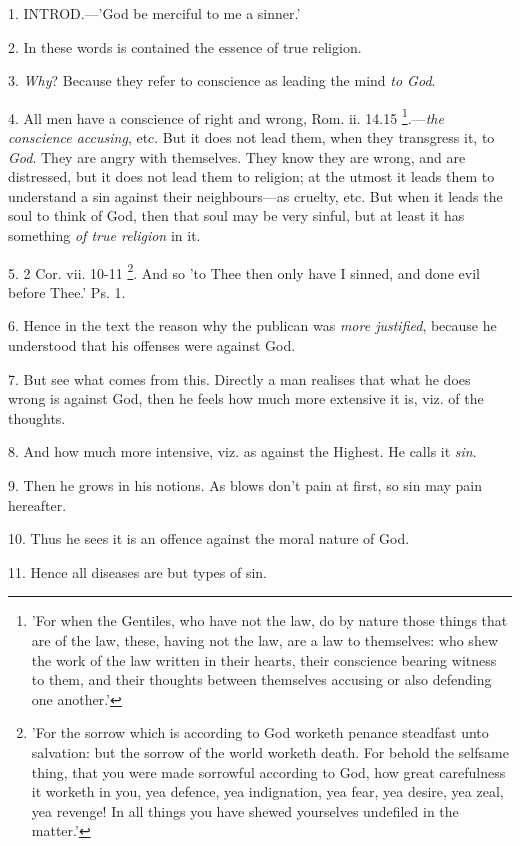 
1. INTROD.—'God
be merciful to me a sinner.'

2. In these words is contained the essence of
true religion.

3. \emph{Why}? Because they refer to conscience
as leading the mind \emph{to God}.

4. All men have a conscience of right and wrong,
Rom. ii. 14.15 \footnote{'For when the Gentiles,
who have not the law, do by nature those things that are of the law,
these, having not the law, are a law to themselves: who shew the work
of the law written in their hearts, their conscience bearing witness
to them, and their thoughts between themselves accusing or also
defending one another.'}.—\emph{the
conscience accusing}, etc. But it does not lead them, when they
transgress it, to \emph{God}. They are angry with themselves. They
know they are wrong, and are distressed, but it does not lead them to
religion; at the utmost it leads them to understand a sin against
their neighbours—as cruelty, etc. But when it leads the soul to
think of God, then that soul may be very sinful, but at least it has
something \emph{of true religion} in it.

5. 2 Cor. vii. 10-11 \footnote{'For the sorrow which is
according to God worketh penance steadfast unto salvation: but the
sorrow of the world worketh death. For behold the selfsame thing, that
you were made sorrowful according to God, how great carefulness it
worketh in you, yea defence, yea indignation, yea fear, yea desire,
yea zeal, yea revenge! In all things you have shewed yourselves
undefiled in the matter.'}. And so 'to Thee then only have I sinned, and done evil before
Thee.' Ps. 1.

6. Hence in the text the reason why the publican
was \emph{more justified}, because he understood that his offenses
were against God.

7. But see what comes from this. Directly a man
realises that what he does wrong is against God, then he feels how
much more extensive it is, viz. of the thoughts.

8. And how much more intensive, viz. as against
the Highest. He calls it \emph{sin}.

9. Then he grows in his notions. As blows don't
pain at first, so sin may pain hereafter.

10. Thus he sees it is an offence against the
moral nature of God.

11. Hence all diseases are but types of sin.

